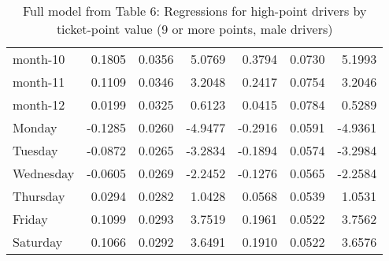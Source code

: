 \documentclass[10pt]{article}
\begin{document}
\begin{table}[ht]
\begin{tabular}{lrrrrrr}
  month-10 & 0.1805 & 0.0356 & 5.0769 & 0.3794 & 0.0730 & 5.1993 \\ 
  month-11 & 0.1109 & 0.0346 & 3.2048 & 0.2417 & 0.0754 & 3.2046 \\ 
  month-12 & 0.0199 & 0.0325 & 0.6123 & 0.0415 & 0.0784 & 0.5289 \\ 
  Monday & -0.1285 & 0.0260 & -4.9477 & -0.2916 & 0.0591 & -4.9361 \\ 
  Tuesday & -0.0872 & 0.0265 & -3.2834 & -0.1894 & 0.0574 & -3.2984 \\ 
  Wednesday & -0.0605 & 0.0269 & -2.2452 & -0.1276 & 0.0565 & -2.2584 \\ 
  Thursday & 0.0294 & 0.0282 & 1.0428 & 0.0568 & 0.0539 & 1.0531 \\ 
  Friday & 0.1099 & 0.0293 & 3.7519 & 0.1961 & 0.0522 & 3.7562 \\ 
  Saturday & 0.1066 & 0.0292 & 3.6491 & 0.1910 & 0.0522 & 3.6576 \\ 
   \hline
\end{tabular}
\caption{Full model from Table 6: Regressions for high-point drivers by ticket-point value (9 or more points, male drivers)} 
\label{tab_6_9plus_pts_no_age_M}
\end{table}


\clearpage
\pagebreak



\end{document}
